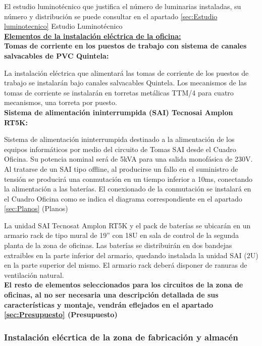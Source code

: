 El estudio luminotécnico que justifica el número de luminarias instaladas, su número y distribución se puede consultar en el apartado \ref{sec:Estudio luminotecnico} Estudio Luminotécnico\\

\underline{\bfseries Elementos de la instalación eléctrica de la oficina:}\\


{\bfseries Tomas de corriente en los puestos de trabajo con sistema de canales salvacables de PVC Quintela:}

La instalación eléctrica que alimentará las tomas de corriente de los puestos de trabajo se instalarán bajo canales salvacables Quintela. Los mecanismos de las tomas de corriente se instalarán en torretas metálicas TTM/4 para cuatro mecanismos, una torreta por puesto.\\

{\bfseries Sistema de alimentación ininterrumpida (SAI) Tecnosai Amplon RT5K:}

Sistema de alimentación ininterrumpida destinado a la alimentación de los equipos informáticos por medio del circuito de Tomas SAI desde el Cuadro Oficina. Su potencia nominal será de 5kVA para una salida monofásica de 230V.\\ 

Al tratarse de un SAI tipo offline, al producirse un fallo en el suministro de tensión se producirá una conmutación en un tiempo inferior a 10ms, conectando la alimentación a las baterías. El conexionado de la conmutación se instalará en el Cuadro Oficina como se indica el diagrama correspondiente en el apartado \ref{sec:Planos} (Planos)\

La unidad SAI Tecnosat Amplon RT5K y el pack de baterías se ubicarán en un armario rack de tipo mural de 19'' con 18U en sala de control de la segunda planta de la zona de oficinas. Las baterías se distribuirán en dos bandejas extraibles en la parte inferior del armario, quedando instalada la unidad SAI (2U) en la parte superior del mismo. El armario rack deberá disponer de ranuras de ventilación natural.\\



{\bfseries El resto de elementos seleccionados para los circuitos de la zona de oficinas, al no ser necesaria una descripción detallada de sus características y montaje, vendrán eflejados en el apartado \ref{sec:Presupuesto} (Presupuesto)}

\subsubsection{Instalación elécrtica de la zona de fabricación y almacén}

